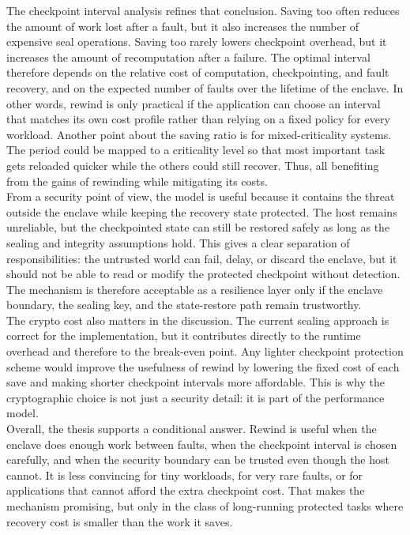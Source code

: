 \documentclass[11pt,a4paper]{report}
\begin{document}
The checkpoint interval analysis refines that conclusion.
Saving too often reduces the amount of work lost after a fault, but it also increases the number of expensive seal operations.
Saving too rarely lowers checkpoint overhead, but it increases the amount of recomputation after a failure.
The optimal interval therefore depends on the relative cost of computation, checkpointing, and fault recovery, and on the expected number of faults over the lifetime of the enclave.
In other words, rewind is only practical if the application can choose an interval that matches its own cost profile rather than relying on a fixed policy for every workload.
Another point about the saving ratio is for mixed-criticality systems. The period could be mapped to a criticality level so that most important task gets reloaded quicker while the others could still recover.
Thus, all benefiting from the gains of rewinding while mitigating its costs.
\\

From a security point of view, the model is useful because it contains the threat outside the enclave while keeping the recovery state protected. The host remains unreliable, but the checkpointed state can still be restored safely as long as the sealing and integrity assumptions hold.
This gives a clear separation of responsibilities: the untrusted world can fail, delay, or discard the enclave, but it should not be able to read or modify the protected checkpoint without detection. 
The mechanism is therefore acceptable as a resilience layer only if the enclave boundary, the sealing key, and the state-restore path remain trustworthy.
\\

The crypto cost also matters in the discussion. The current sealing approach is correct for the implementation, but it contributes directly to the runtime overhead and therefore to the break-even point. 
Any lighter checkpoint protection scheme would improve the usefulness of rewind by lowering the fixed cost of each save and making shorter checkpoint intervals more affordable. 
This is why the cryptographic choice is not just a security detail: it is part of the performance model.
\\

Overall, the thesis supports a conditional answer. 
Rewind is useful when the enclave does enough work between faults, when the checkpoint interval is chosen carefully, and when the security boundary can be trusted even though the host cannot. 
It is less convincing for tiny workloads, for very rare faults, or for applications that cannot afford the extra checkpoint cost. 
That makes the mechanism promising, but only in the class of long-running protected tasks where recovery cost is smaller than the work it saves.
\end{document}
